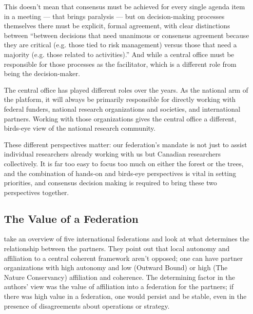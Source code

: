 \documentclass[11pt, letterpaper, twoside]{article}
\begin{document}
This doesn't mean that consensus must be achieved for every single
agenda item in a meeting --- that brings paralysis --- but on
decision-making processes themselves there must be explicit, formal
agreement, with clear distinctions between ``between decisions that need
unanimous or consensus agreement because they are critical (e.g. those
tied to risk management) versus those that need a majority (e.g. those
related to activities).'' And while a central office must be responsible
for those processes as the facilitator, which is a different role from
being the decision-maker.

The central office has played different roles over the years. As the
national arm of the platform, it will always be primarily responsible
for directly working with federal funders, national research
organizations and societies, and international partners.  Working with
those organizations gives the central office a different, birds-eye view
of the national research community.

These different perspectives matter: our federation's mandate is not
just to assist individual researchers already working with us but
Canadian researchers collectively. It is far too easy to focus too much
on either the forest or the trees, and the combination of hands-on and
birds-eye perspectives is vital in setting priorities, and consensus
decision making is required to bring these two perspectives together.

\subsection*{The Value of a Federation}
%

\cite{grossman2001managing} take an overview of five international
federations and look at what determines the relationship between the
partners. They point out that local autonomy and affiliation to a
central coherent framework aren't opposed; one can have partner
organizations with high autonomy and low (Outward Bound) or high (The
Nature Conservancy) affiliation and coherence. The determining factor in
the authors' view was the value of affiliation into a federation for the
partners; if there was high value in a federation, one would persist and
be stable, even in the presence of disagreements about operations or
strategy.

\end{document}
